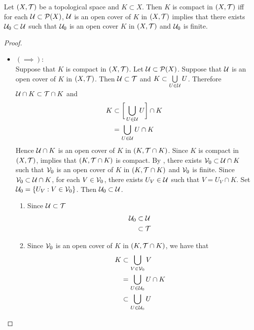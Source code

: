\documentclass{book}
\begin{document}
	\begin{ex} 
		Let $(X, \mathcal{T})$ be a topological space and $K \subset X$. Then $K$ is compact in $(X, \mathcal{T})$ iff for each $\mathcal{U} \subset \mathcal{P}(X)$, $\mathcal{U}$ is an open cover of $K$ in $(X, \mathcal{T})$ implies that there exists $\mathcal{U}_0 \subset \mathcal{U}$ such that $\mathcal{U}_0$ is an open cover $K$ in $(X, \mathcal{T})$ and $\mathcal{U}_0$ is finite.
	\end{ex}

	\begin{proof}\
		\begin{itemize}
			\item $(\implies)$: \\
				Suppose that $K$ is compact in $(X, \mathcal{T})$. Let $\mathcal{U} \subset \mathcal{P}(X)$. Suppose that $\mathcal{U}$ is an open cover of $K$ in $(X, \mathcal{T})$. Then $\mathcal{U} \subset \mathcal{T}$ and $K \subset \bigcup\limits_{U \in \mathcal{U}} U$. Therefore $\mathcal{U} \cap K \subset \mathcal{T} \cap K$ and  
			\begin{align*}
				K 
				& \subset \bigg[  \bigcup\limits_{U \in \mathcal{U}} U \bigg] \cap K \\ 
				& = \bigcup\limits_{U \in \mathcal{U}} U \cap K
			\end{align*}
			Hence $\mathcal{U} \cap K$ is an open cover of $K$ in $(K, \mathcal{T} \cap K)$. Since $K$ is compact in $(X, \mathcal{T})$,  implies that $(K, \mathcal{T} \cap K)$ is compact. By , there exists $\mathcal{V}_0 \subset \mathcal{U} \cap K$ such that $\mathcal{V}_0$ is an open cover of $K$ in $(K, \mathcal{T} \cap K)$ and $\mathcal{V}_0$ is finite. Since $\mathcal{V}_0 \subset \mathcal{U} \cap K$, for each $V \in \mathcal{V}_0$, there exists $U_V \in \mathcal{U}$ such that $V = U_V \cap K$. Set $\mathcal{U}_0 = \{U_V: V \in \mathcal{V}_0\}$. Then $\mathcal{U}_0 \subset \mathcal{U}$. 
			\begin{enumerate}
				\item Since $\mathcal{U} \subset \mathcal{T}$
				\begin{align*}
					\mathcal{U}_0 
					& \subset \mathcal{U} \\
					& \subset \mathcal{T}
				\end{align*}
				\item Since $\mathcal{V}_0$ is an open cover of $K$ in $(K, \mathcal{T} \cap K)$, we have that 
				\begin{align*}
					K 
					& \subset \bigcup_{V \in \mathcal{V}_0} V \\
					& = \bigcup_{U \in \mathcal{U}_0} U \cap K \\
					& \subset \bigcup_{U \in \mathcal{U}_0} U \\
				\end{align*}
			\end{enumerate} 

\end{itemize}
\end{proof}
\end{document}
